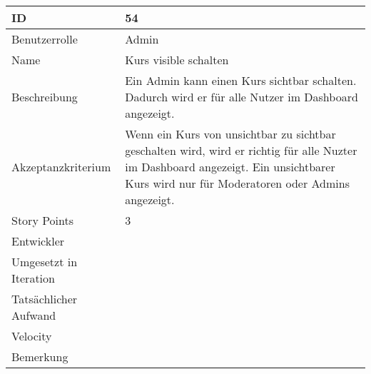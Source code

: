 \begin{tabularx}{\textwidth}{|p{}|X|}
	\hline
	ID & 54\\
	\hline
	Benutzerrolle & Admin\\
	\hline
	Name & Kurs visible schalten\\
	\hline
	Beschreibung & Ein Admin kann einen Kurs sichtbar schalten. Dadurch wird er für alle Nutzer im Dashboard angezeigt.\\
	\hline
	Akzeptanzkriterium & Wenn ein Kurs von unsichtbar zu sichtbar geschalten wird, wird er richtig für alle Nuzter im Dashboard angezeigt. Ein unsichtbarer Kurs wird nur für Moderatoren oder Admins angezeigt.\\
	\hline
	Story Points & 3\\
	\hline
	Entwickler & \\
	\hline
	Umgesetzt in Iteration & \\
	\hline
	Tatsächlicher Aufwand & \\
	\hline
	Velocity & \\
	\hline
	Bemerkung & \\
	\hline
\end{tabularx}
\vspace{20pt}
